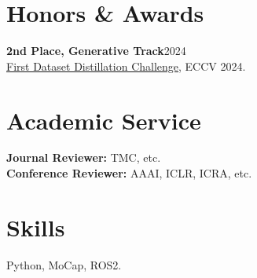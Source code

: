 \documentclass[10pt,a4paper]{article}
\begin{document}
\section*{Honors \& Awards}
\textbf{2nd Place, Generative Track}\hfill 2024\\
\href{https://codalab.lisn.upsaclay.fr/competitions/19577}{First Dataset Distillation Challenge}, ECCV 2024.

\begin{minipage}[t]{0.72\textwidth}
\section*{Academic Service}
\textbf{Journal Reviewer:} TMC, etc.\\
\textbf{Conference Reviewer:} AAAI, ICLR, ICRA, etc.
\end{minipage}\hfill
\begin{minipage}[t]{0.24\textwidth}
\section*{Skills}
Python, MoCap, ROS2.
\end{minipage}
\end{document}
